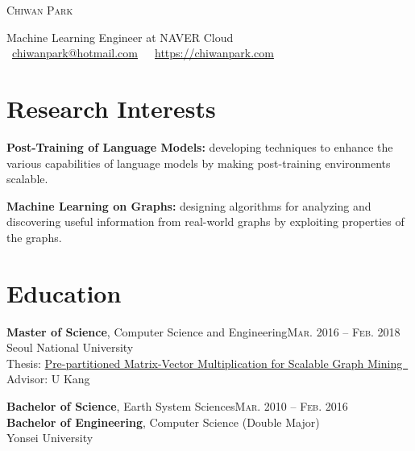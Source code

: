\documentclass[11pt,a4paper]{article}
\makeatletter
\def\myname{Chiwan Park}
\def\myemail{chiwanpark@hotmail.com}
\def\myhomepage{https://chiwanpark.com}
\newenvironment{entry}{
  \begin{list}{}{
    \setlength{\leftmargin}{0em}
    \setlength{\itemsep}{0.25em}
    \setlength{\parskip}{0pt}
    \setlength{\parsep}{0.25em}
  }
}{
  \end{list}
}
\let\orighref\href
\renewcommand{\href}[2]{\orighref{#1}{#2\ {\scriptsize\faIcon{external-link-alt}}}}
\makeatother
\begin{document}
\begin{minipage}[t]{0.375\textwidth}
    \vspace{0pt}
    \Huge
    \textsc{\myname}
\end{minipage}
\hfill
\begin{minipage}[t]{0.6\textwidth}
  \vspace{0pt}
  Machine Learning Engineer at NAVER Cloud\\
  {\scriptsize{}}\ \orighref{mailto:\myemail}{\myemail}\ \ {\scriptsize{}}\ \orighref{\myhomepage}{\myhomepage}
\end{minipage}

\section*{Research Interests}
\begin{entry}
\item \textbf{Post-Training of Language Models:} developing techniques to enhance the various capabilities of language models by making post-training environments scalable.
  \item \textbf{Machine Learning on Graphs:} designing algorithms for analyzing and discovering useful information from real-world graphs by exploiting properties of the graphs.
\end{entry}

\section*{Education}
\begin{entry}
  \item \textbf{Master of Science}, Computer Science and Engineering\hfill\textsc{Mar. 2016 -- Feb. 2018}\\
        Seoul National University\\
        Thesis: \href{https://s-space.snu.ac.kr/bitstream/10371/141560/1/000000151119.pdf}{Pre-partitioned Matrix-Vector Multiplication for Scalable Graph Mining}\\
        Advisor: U Kang
  \item \textbf{Bachelor of Science}, Earth System Sciences\hfill\textsc{Mar. 2010 -- Feb. 2016}\\
        \textbf{Bachelor of Engineering}, Computer Science (Double Major)\\
        Yonsei University
\end{entry}
\end{document}
